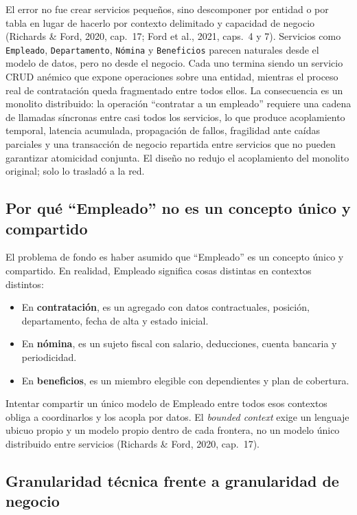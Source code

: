 \documentclass[12pt,a4paper]{article}
\begin{document}
El error no fue crear servicios pequeños, sino descomponer por entidad o por tabla en lugar de hacerlo por contexto delimitado y capacidad de negocio (Richards \& Ford, 2020, cap.~17; Ford et al., 2021, caps.~4 y 7). Servicios como \texttt{Empleado}, \texttt{Departamento}, \texttt{Nómina} y \texttt{Beneficios} parecen naturales desde el modelo de datos, pero no desde el negocio. Cada uno termina siendo un servicio CRUD anémico que expone operaciones sobre una entidad, mientras el proceso real de contratación queda fragmentado entre todos ellos. La consecuencia es un monolito distribuido: la operación ``contratar a un empleado'' requiere una cadena de llamadas síncronas entre casi todos los servicios, lo que produce acoplamiento temporal, latencia acumulada, propagación de fallos, fragilidad ante caídas parciales y una transacción de negocio repartida entre servicios que no pueden garantizar atomicidad conjunta. El diseño no redujo el acoplamiento del monolito original; solo lo trasladó a la red.

\subsection{Por qué ``Empleado'' no es un concepto único y compartido}

El problema de fondo es haber asumido que ``Empleado'' es un concepto único y compartido. En realidad, Empleado significa cosas distintas en contextos distintos:

\begin{itemize}[label=$\cdot$]
  \item En \textbf{contratación}, es un agregado con datos contractuales, posición, departamento, fecha de alta y estado inicial.
  \item En \textbf{nómina}, es un sujeto fiscal con salario, deducciones, cuenta bancaria y periodicidad.
  \item En \textbf{beneficios}, es un miembro elegible con dependientes y plan de cobertura.
\end{itemize}

Intentar compartir un único modelo de Empleado entre todos esos contextos obliga a coordinarlos y los acopla por datos. El \emph{bounded context} exige un lenguaje ubicuo propio y un modelo propio dentro de cada frontera, no un modelo único distribuido entre servicios (Richards \& Ford, 2020, cap.~17).

\subsection{Granularidad técnica frente a granularidad de negocio}
\end{document}
